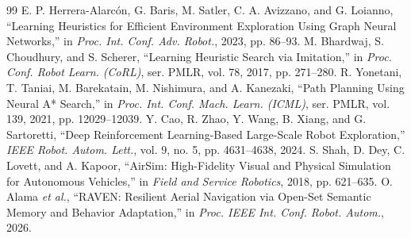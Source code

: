 \documentclass[letterpaper,10pt,conference]{ieeeconf}
\begin{document}
\begin{thebibliography}{99}
E. P. Herrera-Alarc\'on, G. Baris, M. Satler, C. A. Avizzano, and
G. Loianno,
``Learning Heuristics for Efficient Environment Exploration Using
Graph Neural Networks,'' in \emph{Proc. Int. Conf. Adv. Robot.},
2023, pp. 86--93.
M. Bhardwaj, S. Choudhury, and S. Scherer,
``Learning Heuristic Search via Imitation,'' in \emph{Proc. Conf.
Robot Learn. (CoRL)}, ser. PMLR, vol. 78, 2017, pp. 271--280.
R. Yonetani, T. Taniai, M. Barekatain, M. Nishimura, and A. Kanezaki,
``Path Planning Using Neural A* Search,'' in \emph{Proc. Int. Conf.
Mach. Learn. (ICML)}, ser. PMLR, vol. 139, 2021, pp. 12029--12039.
Y. Cao, R. Zhao, Y. Wang, B. Xiang, and G. Sartoretti,
``Deep Reinforcement Learning-Based Large-Scale Robot Exploration,''
\emph{IEEE Robot. Autom. Lett.}, vol. 9, no. 5, pp. 4631--4638, 2024.
S. Shah, D. Dey, C. Lovett, and A. Kapoor,
``AirSim: High-Fidelity Visual and Physical Simulation for Autonomous
Vehicles,'' in \emph{Field and Service Robotics}, 2018, pp. 621--635.
O. Alama \emph{et al.},
``RAVEN: Resilient Aerial Navigation via Open-Set Semantic Memory and
Behavior Adaptation,'' in \emph{Proc. IEEE Int. Conf. Robot. Autom.},
2026.

\end{thebibliography}
\endgroup
\end{document}

